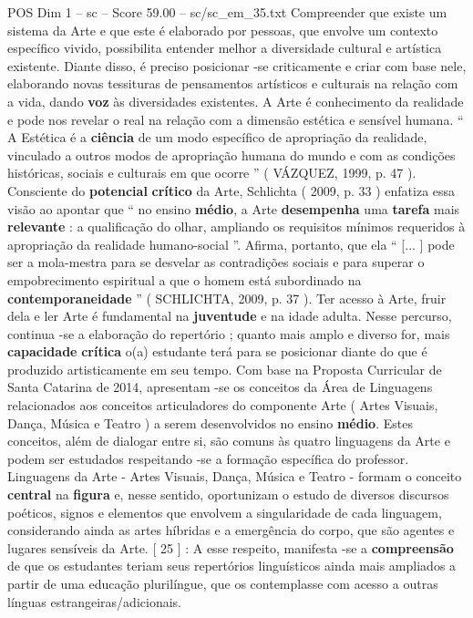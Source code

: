 \begin{textsample}{POS Dim 1 – sc – Score 59.00 – sc/sc\_em\_35.txt}
Compreender que existe um sistema da Arte e que este é elaborado por pessoas, que envolve um contexto específico vivido, possibilita entender melhor a diversidade cultural e artística existente.
Diante disso, é preciso posicionar -se criticamente e criar com base nele, elaborando novas tessituras de pensamentos artísticos e culturais na relação com a vida, dando \textbf{voz} às diversidades existentes.
A Arte é conhecimento da realidade e pode nos revelar o real na relação com a dimensão estética e sensível humana. “ A Estética é a \textbf{ciência} de um modo específico de apropriação da realidade, vinculado a outros modos de apropriação humana do mundo e com as condições históricas, sociais e culturais em que ocorre ” ( VÁZQUEZ, 1999, p. 47 ).
Consciente do \textbf{potencial} \textbf{crítico} da Arte, Schlichta ( 2009, p. 33 ) enfatiza essa visão ao apontar que “ no ensino \textbf{médio}, a Arte \textbf{desempenha} uma \textbf{tarefa} mais \textbf{relevante} : a qualificação do olhar, ampliando os requisitos mínimos requeridos à apropriação da realidade humano-social ”.
Afirma, portanto, que ela “ [... ] pode ser a mola-mestra para se desvelar as contradições sociais e para superar o empobrecimento espiritual a que o homem está subordinado na \textbf{contemporaneidade} ” ( SCHLICHTA, 2009, p. 37 ).
Ter acesso à Arte, fruir dela e ler Arte é fundamental na \textbf{juventude} e na idade adulta.
Nesse percurso, continua -se a elaboração do repertório ; quanto mais amplo e diverso for, mais \textbf{capacidade} \textbf{crítica} o(a) estudante terá para se posicionar diante do que é produzido artisticamente em seu tempo.
Com base na Proposta Curricular de Santa Catarina de 2014, apresentam -se os conceitos da Área de Linguagens relacionados aos conceitos articuladores do componente Arte ( Artes Visuais, Dança, Música e Teatro ) a serem desenvolvidos no ensino \textbf{médio}.
Estes conceitos, além de dialogar entre si, são comuns às quatro linguagens da Arte e podem ser estudados respeitando -se a formação específica do professor.
Linguagens da Arte - Artes Visuais, Dança, Música e Teatro - formam o conceito \textbf{central} na \textbf{figura} e, nesse sentido, oportunizam o estudo de diversos discursos poéticos, signos e elementos que envolvem a singularidade de cada linguagem, considerando ainda as artes híbridas e a emergência do corpo, que são agentes e lugares sensíveis da Arte. [ 25 ] : A esse respeito, manifesta -se a \textbf{compreensão} de que os estudantes teriam seus repertórios linguísticos ainda mais ampliados a partir de uma educação plurilíngue, que os contemplasse com acesso a outras línguas estrangeiras/adicionais.


\end{textsample}
